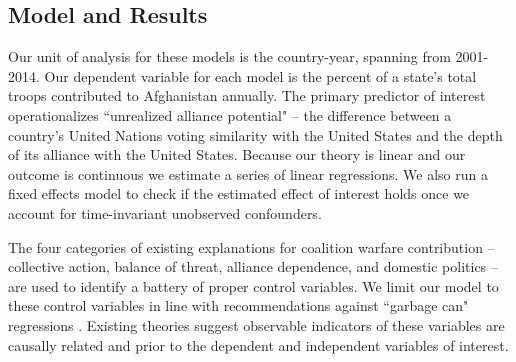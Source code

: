 \documentclass[12pt,letterpaper]{article}
\begin{document}
	\subsection{Model and Results}
		Our unit of analysis for these models is the country-year, spanning from 2001-2014. Our dependent variable for each model is the percent of a state's total troops contributed to Afghanistan annually. The primary predictor of interest operationalizes ``unrealized alliance potential" -- the difference between a country's United Nations voting similarity with the United States and the depth of its alliance with the United States. Because our theory is linear and our outcome is continuous we estimate a series of linear regressions. We also run a fixed effects model to check if the estimated effect of interest holds once we account for time-invariant unobserved confounders.

		The four categories of existing explanations for coalition warfare contribution -- collective action, balance of threat, alliance dependence, and domestic politics -- are used to identify a battery of proper control variables. We limit our model to these control variables in line with recommendations against ``garbage can" regressions \citep{ray_explaininginterstateconflict_2003, bleek_securityguaranteesallied_2014}. Existing theories suggest observable indicators of these variables are causally related and prior to the dependent and independent variables of interest.
		
\end{document}
